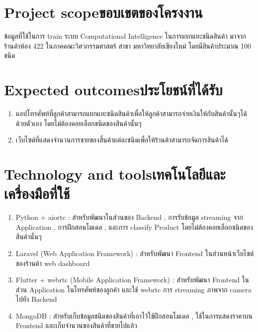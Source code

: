 \section{\ifenglish Project scope\else ขอบเขตของโครงงาน\fi}
ข้อมูลที่ใช้ในการ train ระบบ  Computational Intelligence  ในการแยกแยะชนิดสินค้า 
มาจาก ร้านค้าห้อง 422 ในภาคคณะวิศวกรรมศาสตร์ สาขา มหาวิทยาลัยเชียงใหม่ โดยมีสินค้าประมาณ 100 ชนิด


\section{\ifenglish Expected outcomes\else ประโยชน์ที่ได้รับ\fi}
\begin{enumerate}
    \item แอปโทรศัพท์ที่ลูกค้าสามารถแยกแยะชนิดสินค้าเพื่อให้ลูกค้าสามารถจ่ายเงินให้กับสินค้านั้นๆได้ด้วยตัวเอง โดยไม่ต้องคอยเลือกชนิดของสินค้านั้นๆ
    \item เว็บไซต์ที่แสดงจำนวนการขายของสิ้นค้าแต่ละชนิดเพื่อให้ร้านค้าสามารถจัดการสินค้าได้
\end{enumerate}
\section{\ifenglish Technology and tools\else เทคโนโลยีและเครื่องมือที่ใช้\fi}
\begin{enumerate}
    \item Python + aiortc : สำหรับพัฒนาในส่วนของ Backend   , การรับข้อมูล streaming จาก Application   , การฝึกสอนโมเดล , และการ classify Product
    โดยไม่ต้องคอยเลือกชนิดของสินค้านั้นๆ

    \item Laravel (Web Application Framework) : สำหรับพัฒนา Frontend ในส่วนหน้าเว็บไซต์ของร้านค้า web dashboard
    \item Flutter + webrtc  (Mobile Application Framework) : สำหรับพัฒนา Frontend  ในส่วน Application ในโทรศัพท์ของลูกค้า และใช้ webrtc  การ streaming ภาพจาก camera  ไปยัง Backend
    \item MongoDB : สำหรับเก็บข้อมูลชนิดของสินค้าที่เอาไว้ใช้ฝึกสอนโมเดล , ใช้ในการแสดงราคาบน Frontend  และเก็บจำนวนของสินค้าที่ขายไปแล้ว

\end{enumerate}

